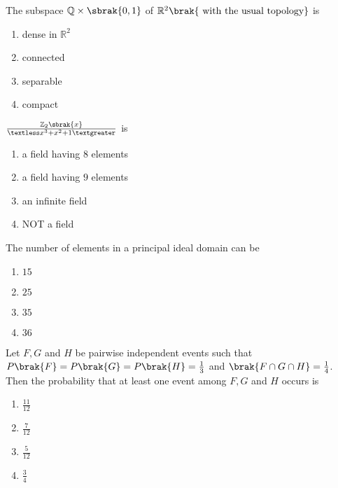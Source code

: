 \iffalse
	\title{2009-MA-13-24}
	\author{EE24Btech11006 - Arnav Mahishi}
	\section{ma}
	\chapter{2009}
\fi
\item{
The subspace $\mathbb{Q}\times\sbrak{0,1}$ of $\mathbb{R}^2\brak{\text{ with the usual topology}}$ is 
\begin{multicols}{4}
\begin{enumerate}
\item dense in $\mathbb{R}^2$
\item connected
\item separable 
\item compact
\end{enumerate}
\end{multicols}
}
\item{
$\frac{\mathbb{Z}_2\sbrak{x}}{\textless x^3+x^2+1\textgreater}$ is
\begin{multicols}{2}
\begin{enumerate}
\item a field having $8$ elements 
\item a field having $9$ elements 
\item an infinite field
\item NOT a field
\end{enumerate}
\end{multicols}}
\item{
The number of elements in a principal ideal domain can be
\begin{multicols}{4}
\begin{enumerate}
\item $15$
\item $25$
\item $35$
\item $36$
\end{enumerate}
\end{multicols}
}
\item{
Let $F,G$ and $H$ be pairwise independent events such that $P\brak{F}=P\brak{G}=P\brak{H}=\frac{1}{3}$ and $\brak{F\cap G\cap H}=\frac{1}{4}$. Then the probability that at least one event among $F,G$ and $H$ occurs is
\begin{multicols}{4}
\begin{enumerate}
\item $\frac{11}{12}$
\item $\frac{7}{12}$
\item $\frac{5}{12}$
\item $\frac{3}{4}$
\end{enumerate}
\end{multicols}
}
